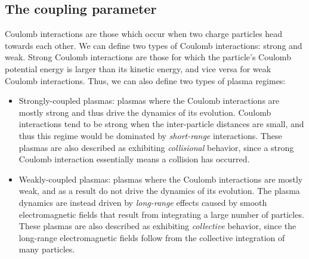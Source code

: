 \documentclass[a4paper,11pt]{report}
\begin{document}
\subsection{The coupling parameter}

Coulomb interactions are those which occur when two charge particles head towards each other. We can define two types of Coulomb interactions: strong and weak. Strong Coulomb interactions are those for which the particle's Coulomb potential energy is larger than its kinetic energy, and vice versa for weak Coulomb interactions. Thus, we can also define two types of plasma regimes:
\begin{itemize}
    \item Strongly-coupled plasmas: plasmas where the Coulomb interactions are mostly strong and thus drive the dynamics of its evolution. Coulomb interactions tend to be strong when the inter-particle distances are small, and thus this regime would be dominated by \textit{short-range} interactions. These plasmas are also described as exhibiting \textit{collisional} behavior, since a strong Coulomb interaction essentially means a collision has occurred.
    \item Weakly-coupled plasmas: plasmas where the Coulomb interactions are mostly weak, and as a result do not drive the dynamics of its evolution. The plasma dynamics are instead driven by \textit{long-range} effects caused by smooth electromagnetic fields that result from integrating a large number of particles. These plasmas are also described as exhibiting \textit{collective} behavior, since the long-range electromagnetic fields follow from the collective integration of many particles.
\end{itemize}
\end{document}
